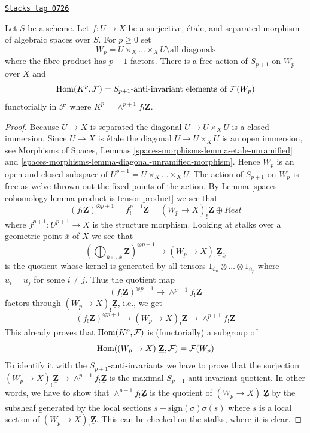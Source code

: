 \begin{lemma}[Compute]
\label{spaces-cohomology-lemma-compute}
\href{https://stacks.math.columbia.edu/tag/0726}{\texttt{Stacks tag 0726}}

Let $S$ be a scheme. Let $f : U \to X$ be a surjective, \'etale, and separated
morphism of algebraic spaces over $S$. For $p \geq 0$ set
$$
W_p = U \times_X \ldots \times_X U \setminus \text{all diagonals}
$$
where the fibre product has $p + 1$ factors.
There is a free action of $S_{p + 1}$ on $W_p$ over $X$ and
$$
\operatorname{Hom}(K^p, \mathcal{F}) = S_{p + 1}\text{-anti-invariant elements of }
\mathcal{F}(W_p)
$$
functorially in $\mathcal{F}$ where
$K^p = \wedge^{p + 1}f_!\underline{\mathbf{Z}}$.
\end{lemma}

\begin{proof}
Because $U \to X$ is separated the diagonal $U \to U \times_X U$ is a
closed immersion. Since $U \to X$ is \'etale the diagonal
$U \to U \times_X U$ is an open immersion, see
Morphisms of Spaces, Lemmas
\ref{spaces-morphisms-lemma-etale-unramified} and
\ref{spaces-morphisms-lemma-diagonal-unramified-morphism}.
Hence $W_p$ is an open and closed subspace of
$U^{p + 1} = U \times_X \ldots \times_X U$. The action of $S_{p + 1}$
on $W_p$ is free as we've thrown out the fixed points of the action.
By
Lemma \ref{spaces-cohomology-lemma-product-is-tensor-product}
we see that
$$
(f_!\underline{\mathbf{Z}})^{\otimes p + 1} =
f^{p + 1}_!\underline{\mathbf{Z}} = (W_p \to X)_!\underline{\mathbf{Z}}
\oplus Rest
$$
where $f^{p + 1} : U^{p + 1} \to X$ is the structure morphism.
Looking at stalks over a geometric point $\overline{x}$ of $X$
we see that
$$
\left(
\bigoplus\nolimits_{\overline{u} \mapsto \overline{x}} \mathbf{Z}
\right)^{\otimes p + 1}
\longrightarrow
(W_p \to X)_!\underline{\mathbf{Z}}_{\overline{x}}
$$
is the quotient whose kernel is generated by all tensors
$1_{\overline{u}_0} \otimes \ldots \otimes 1_{\overline{u}_p}$
where $\overline{u}_i = \overline{u}_j$ for some $i \not = j$.
Thus the quotient map
$$
(f_!\underline{\mathbf{Z}})^{\otimes p + 1}
\longrightarrow
\wedge^{p + 1}f_!\underline{\mathbf{Z}}
$$
factors through $(W_p \to X)_!\underline{\mathbf{Z}}$, i.e., we get
$$
(f_!\underline{\mathbf{Z}})^{\otimes p + 1}
\longrightarrow
(W_p \to X)_!\underline{\mathbf{Z}}
\longrightarrow
\wedge^{p + 1}f_!\underline{\mathbf{Z}}
$$
This already proves that $\operatorname{Hom}(K^p, \mathcal{F})$ is (functorially) a
subgroup of
$$
\operatorname{Hom}((W_p \to X)_!\underline{\mathbf{Z}}, \mathcal{F}) = \mathcal{F}(W_p)
$$
To identify it with the $S_{p + 1}$-anti-invariants we have to prove that
the surjection $(W_p \to X)_!\underline{\mathbf{Z}}
\to \wedge^{p + 1}f_!\underline{\mathbf{Z}}$ is the maximal
$S_{p + 1}$-anti-invariant quotient. In other words, we have to show that
$\wedge^{p + 1}f_!\underline{\mathbf{Z}}$ is the quotient of
$(W_p \to X)_!\underline{\mathbf{Z}}$ by the subsheaf generated by
the local sections $s - \text{sign}(\sigma)\sigma(s)$ where $s$ is
a local section of $(W_p \to X)_!\underline{\mathbf{Z}}$.
This can be checked on the stalks, where it is clear.
\end{proof}

